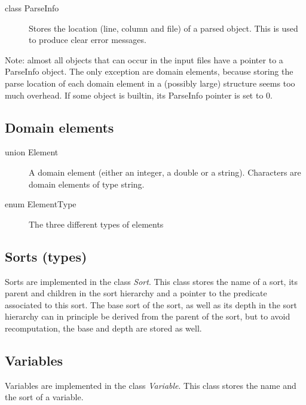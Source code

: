 \documentclass{article}
\begin{document}
\begin{description}
	\item[class ParseInfo] Stores the location (line, column and file) of a parsed object. This is used to produce clear error messages.
\end{description}
Note: almost all objects that can occur in the input files have a pointer to a ParseInfo object. The only exception are domain elements, because storing the parse location of each domain element in a (possibly large) structure seems too much overhead. If some object is builtin, its ParseInfo pointer is set to 0.

\subsection*{Domain elements}

\begin{description}
	\item[union Element] A domain element (either an integer, a double or a string). Characters are domain elements of type string.  
	\item[enum ElementType] The three different types of elements
\end{description}

\subsection*{Sorts (types)}

Sorts are implemented in the class \emph{Sort}. This class stores the name of a sort, its parent and children in the sort hierarchy and a pointer to the predicate associated to this sort. The base sort of the sort, as well as its depth in the sort hierarchy can in principle be derived from the parent of the sort, but to avoid recomputation, the base and depth are stored as well.

\subsection*{Variables}

Variables are implemented in the class \emph{Variable}. This class stores the name and the sort of a variable.
\end{document}
